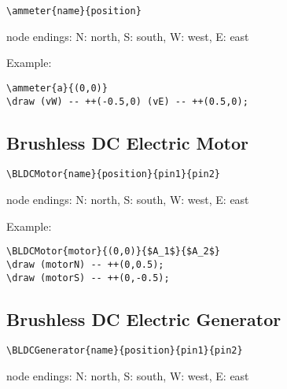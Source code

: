 \documentclass[parskip=full]{scrartcl}
\begin{document}
\begin{verbatim}
\ammeter{name}{position}
\end{verbatim}
node endings: N: north, S: south, W: west, E: east

Example:\\
\begin{minipage}{0.8\textwidth}
\begin{verbatim}
\ammeter{a}{(0,0)}
\draw (vW) -- ++(-0.5,0) (vE) -- ++(0.5,0);
\end{verbatim}
\end{minipage}
\begin{minipage}{0.19\textwidth}
\end{minipage}

\subsection{Brushless DC Electric Motor}

\begin{verbatim}
\BLDCMotor{name}{position}{pin1}{pin2}
\end{verbatim}
node endings: N: north, S: south, W: west, E: east

Example:\\
\begin{minipage}{0.8\textwidth}
\begin{verbatim}
\BLDCMotor{motor}{(0,0)}{$A_1$}{$A_2$}
\draw (motorN) -- ++(0,0.5);
\draw (motorS) -- ++(0,-0.5);
\end{verbatim}
\end{minipage}
\begin{minipage}{0.19\textwidth}
\end{minipage}

\subsection{Brushless DC Electric Generator}

\begin{verbatim}
\BLDCGenerator{name}{position}{pin1}{pin2}
\end{verbatim}
node endings: N: north, S: south, W: west, E: east
\end{document}
